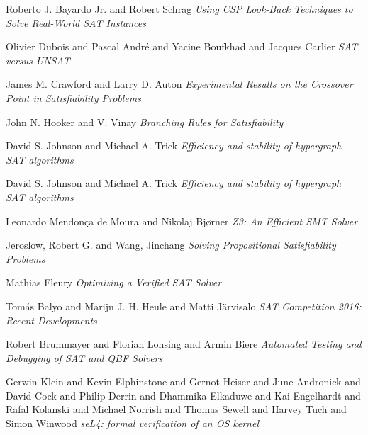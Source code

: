 \begin{thebibliography}{9}
Roberto J. {Bayardo Jr.} and
               Robert Schrag
\textit{Using {CSP} Look-Back Techniques to Solve Real-World {SAT} Instances}

Olivier Dubois and
               Pascal Andr{\'{e}} and
               Yacine Boufkhad and
               Jacques Carlier
\textit{{SAT} versus {UNSAT}}

James M. Crawford and
               Larry D. Auton
\textit{Experimental Results on the Crossover Point in Satisfiability Problems}

John N. Hooker and
               V. Vinay
\textit{Branching Rules for Satisfiability}

David S. Johnson and
               Michael A. Trick
\textit{Efficiency and stability of hypergraph {SAT} algorithms}

David S. Johnson and
               Michael A. Trick
\textit{Efficiency and stability of hypergraph {SAT} algorithms}

Leonardo Mendon{\c{c}}a de Moura and
               Nikolaj Bj{\o}rner
\textit{{Z3:} An Efficient {SMT} Solver}

Jeroslow, Robert G. and Wang, Jinchang
\textit{Solving Propositional Satisfiability Problems}

Mathias Fleury
\textit{Optimizing a Verified {SAT} Solver}

Tom{\'{a}}s Balyo and
               Marijn J. H. Heule and
               Matti J{\"{a}}rvisalo
\textit{{SAT} Competition 2016: Recent Developments}

Robert Brummayer and
               Florian Lonsing and
               Armin Biere
\textit{Automated Testing and Debugging of {SAT} and {QBF} Solvers}

Gerwin Klein and
               Kevin Elphinstone and
               Gernot Heiser and
               June Andronick and
               David Cock and
               Philip Derrin and
               Dhammika Elkaduwe and
               Kai Engelhardt and
               Rafal Kolanski and
               Michael Norrish and
               Thomas Sewell and
               Harvey Tuch and
               Simon Winwood
\textit{seL4: formal verification of an {OS} kernel}


\end{thebibliography}
